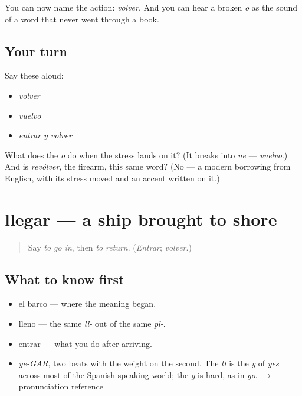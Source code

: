 \begin{grammarlens}[title={What you've built}]
You can now name the action: \emph{volver}. And you can hear a broken \emph{o} as the sound of a word that never went through a book.
\end{grammarlens}

\subsection*{Your turn}
Say these aloud:

\begin{itemize}
\raggedright
  \item \emph{volver}
  \item \emph{vuelvo}
  \item \emph{entrar y volver}
\end{itemize}

\begin{tcolorbox}[breakable,colback=teal!4,colframe=teal!35!black,title={Before you move on}]
What does the \emph{o} do when the stress lands on it? (It breaks into \emph{ue} — \emph{vuelvo}.) And is \emph{revólver}, the firearm, this same word? (No — a modern borrowing from English, with its stress moved and an accent written on it.)
\end{tcolorbox}
\section[llegar]{llegar — a ship brought to shore}

\label{lesson:ES-C395-llegar}



\begin{quote}
Say \emph{to go in}, then \emph{to return}. (\emph{Entrar}; \emph{volver}.)
\end{quote}

\subsection*{What to know first}
\begin{itemize}
\raggedright
  \item el barco — where the meaning began.
  \item lleno — the same \emph{ll-} out of the same \emph{pl-}.
  \item entrar — what you do after arriving.
\end{itemize}

\begin{sounds}
\begin{itemize}
\raggedright
  \item \emph{ye-GAR}, two beats with the weight on the second. The \emph{ll} is the \emph{y} of \emph{yes} across most of the Spanish-speaking world; the \emph{g} is hard, as in \emph{go}. $\to$ pronunciation reference
\end{itemize}
\end{sounds}

